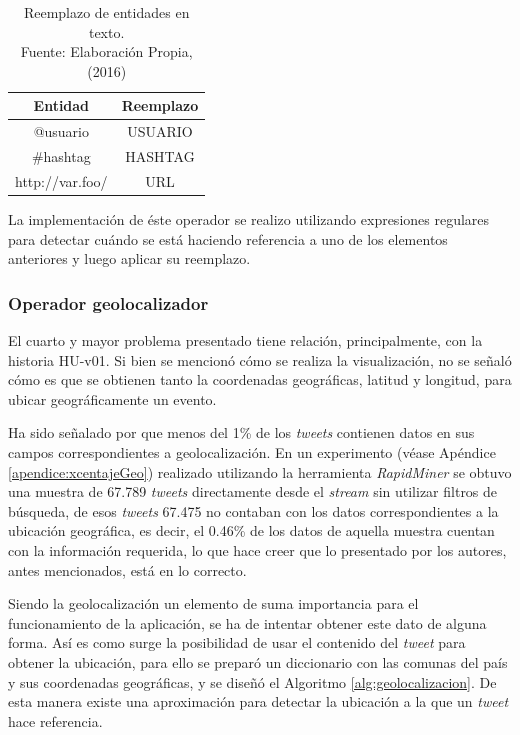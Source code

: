 \begin{table}[H]
\centering
\caption[Reemplazo de entidades en texto.]{Reemplazo de entidades en texto.\\Fuente: Elaboración Propia, (2016)}
\label{tab:reemplazosDeEntidades}
\begin{tabular}{|c|c|}
\hline
\textbf{Entidad} & \textbf{Reemplazo} \\ \hline
@usuario         & USUARIO            \\ \hline
\#hashtag        & HASHTAG            \\ \hline
http://var.foo/  & URL                \\ \hline
\end{tabular}
\end{table}

La implementación de éste operador se realizo utilizando expresiones regulares para detectar cuándo se está haciendo referencia a uno de los elementos anteriores y luego aplicar su reemplazo.

\subsubsection*{Operador geolocalizador}
\label{subsubsec:4op}

El cuarto y mayor problema presentado tiene relación, principalmente, con la historia HU-v01. Si bien se mencionó cómo se realiza la visualización, no se señaló cómo es que se obtienen tanto la coordenadas geográficas, latitud y longitud, para ubicar geográficamente un evento.

Ha sido señalado por \cite{ChatoSurvey} que menos del 1\% de los \textit{tweets} contienen datos en sus campos correspondientes a geolocalización. En un experimento (véase Apéndice \ref{apendice:xcentajeGeo}) realizado utilizando la herramienta \textit{RapidMiner} se obtuvo una muestra de 67.789 \textit{tweets} directamente desde el \textit{stream} sin utilizar filtros de búsqueda, de esos \textit{tweets} 67.475 no contaban con los datos correspondientes a la ubicación geográfica, es decir, el 0.46\% de los datos de aquella muestra cuentan con la información requerida, lo que hace creer que lo presentado por los autores, antes mencionados, está en lo correcto.

Siendo la geolocalización un elemento de suma importancia para el funcionamiento de la aplicación, se ha de intentar obtener este dato de alguna forma. Así es como surge la posibilidad de usar el contenido del \textit{tweet} para obtener la ubicación, para ello se preparó un diccionario con las comunas del país y sus coordenadas geográficas, \cite{ubicacionesChile} y se diseñó el Algoritmo \ref{alg:geolocalizacion}. De esta manera existe una aproximación para detectar la ubicación a la que un \textit{tweet} hace referencia.\\

